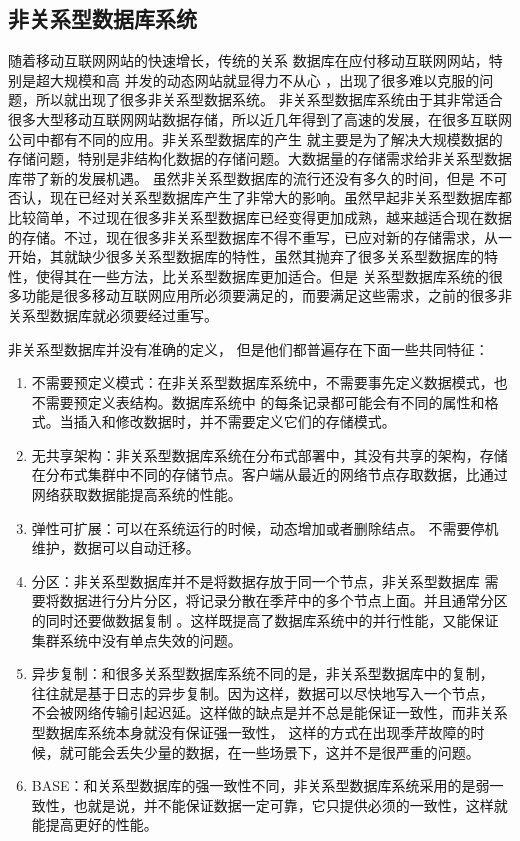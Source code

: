 \subsection{非关系型数据库系统}
随着移动互联网网站的快速增长，传统的关系
数据库在应付移动互联网网站，特别是超大规模和高
并发的动态网站就显得力不从心
，出现了很多难以克服的问题，所以就出现了很多非关系型数据系统。
非关系型数据库系统由于其非常适合很多大型移动互联网网站数据存储，所以近几年得到了高速的发展，在很多互联网公司中都有不同的应用。非关系型数据库的产生
就主要是为了解决大规模数据的存储问题，特别是非结构化数据的存储问题。大数据量的存储需求给非关系型数据库带了新的发展机遇。
虽然非关系型数据库的流行还没有多久的时间，但是
不可否认，现在已经对关系型数据库产生了非常大的影响。虽然早起非关系型数据库都比较简单，不过现在很多非关系型数据库已经变得更加成熟，越来越适合现在数据的存储。不过，现在很多非关系型数据库不得不重写，已应对新的存储需求，从一开始，其就缺少很多关系型数据库的特性，虽然其抛弃了很多关系型数据库的特性，使得其在一些方法，比关系型数据库更加适合。但是
关系型数据库系统的很多功能是很多移动互联网应用所必须要满足的，而要满足这些需求，之前的很多非关系型数据库就必须要经过重写。

非关系型数据库并没有准确的定义，
但是他们都普遍存在下面一些共同特征：
\begin{enumerate}[fullwidth,itemindent=2em]
	\item   不需要预定义模式：在非关系型数据库系统中，不需要事先定义数据模式，也不需要预定义表结构。数据库系统中
	的每条记录都可能会有不同的属性和格式。当插入和修改数据时，并不需要定义它们的存储模式。
\item 	无共享架构：非关系型数据库系统在分布式部署中，其没有共享的架构，存储在分布式集群中不同的存储节点。客户端从最近的网络节点存取数据，比通过网络获取数据能提高系统的性能。
\item 	弹性可扩展：可以在系统运行的时候，动态增加或者删除结点。
不需要停机维护，数据可以自动迁移。
\item 	分区：非关系型数据库并不是将数据存放于同一个节点，非关系型数据库
需要将数据进行分片分区，将记录分散在季芹中的多个节点上面。并且通常分区的同时还要做数据复制
。这样既提高了数据库系统中的并行性能，又能保证集群系统中没有单点失效的问题。
\item 	异步复制：和很多关系型数据库系统不同的是，非关系型数据库中的复制，
往往就是基于日志的异步复制。因为这样，数据可以尽快地写入一个节点，
不会被网络传输引起迟延。这样做的缺点是并不总是能保证一致性，而非关系型数据库系统本身就没有保证强一致性，
这样的方式在出现季芹故障的时候，就可能会丢失少量的数据，在一些场景下，这并不是很严重的问题。
\item 	BASE：和关系型数据库的强一致性不同，非关系型数据库系统采用的是弱一致性，也就是说，并不能保证数据一定可靠，它只提供必须的一致性，这样就能提高更好的性能。
\end{enumerate}

